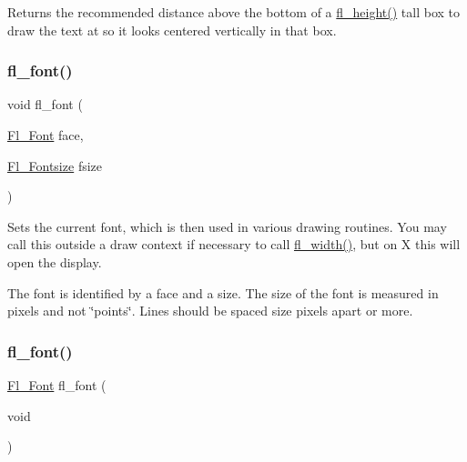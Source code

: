 Returns the recommended distance above the bottom of a \hyperlink{group__fl__attributes_gac4acb828270adf35bf1d8fc06051f938}{fl\+\_\+height()} tall box to draw the text at so it looks centered vertically in that box. \mbox{\label{group__fl__attributes_ga80203d2dd1e06550e7a35d6bb72f9bd6}} 
\subsubsection{\texorpdfstring{fl\+\_\+font()}{fl\_font()}\hspace{0.1cm}{\footnotesize\ttfamily [1/2]}}
{\footnotesize\ttfamily void fl\+\_\+font (\begin{DoxyParamCaption}\item[{\hyperlink{_enumerations_8_h_a2ac46d9f082834b969fffe490a03a709}{Fl\+\_\+\+Font}}]{face,  }\item[{\hyperlink{_enumerations_8_h_ad58927f5c691454480f7cd28362502f1}{Fl\+\_\+\+Fontsize}}]{fsize }\end{DoxyParamCaption})\hspace{0.3cm}{\ttfamily [inline]}}

Sets the current font, which is then used in various drawing routines. You may call this outside a draw context if necessary to call \hyperlink{group__fl__attributes_ga92c762ce2fc7fa891bac6b7590f967bd}{fl\+\_\+width()}, but on X this will open the display.

The font is identified by a {\ttfamily face} and a {\ttfamily size}. The size of the font is measured in pixels and not \char`\"{}points\char`\"{}. Lines should be spaced {\ttfamily size} pixels apart or more. \mbox{\label{group__fl__attributes_gad234d90fe63191609ec196e1b8041d1a}} 
\subsubsection{\texorpdfstring{fl\+\_\+font()}{fl\_font()}\hspace{0.1cm}{\footnotesize\ttfamily [2/2]}}
{\footnotesize\ttfamily \hyperlink{_enumerations_8_h_a2ac46d9f082834b969fffe490a03a709}{Fl\+\_\+\+Font} fl\+\_\+font (\begin{DoxyParamCaption}\item[{void}]{ }\end{DoxyParamCaption})\hspace{0.3cm}{\ttfamily [inline]}}

